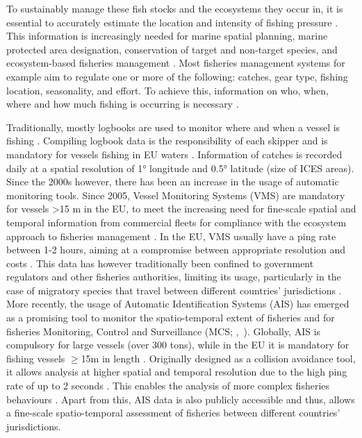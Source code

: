 To sustainably manage these fish stocks and the ecosystems they occur in, it is essential to accurately estimate the location and intensity of fishing pressure \citep{piet_fishing_indicators,russo_indicators,fishing_grounds_greece}. This information
is increasingly needed for marine spatial planning, marine protected area designation, conservation of target and non-target species, and ecosystem-based fisheries management
\citep{vespe_map_2016,henrique_effort_estimation,tidd_importance_effort,gerritsen2010,ais_mpa_designation,ais_bycatch,ais_bird_bycatch}. Most fisheries management systems for example aim to regulate one
or more of the following: catches, gear type, fishing location, seasonality, and effort. To achieve this, information on who, when, where and how much fishing is occurring is necessary \citep{orofino_transparency}.

\medskip

Traditionally, mostly logbooks are used to monitor where and when a vessel is fishing \citep{HINTZEN201231}. Compiling logbook data is the responsibility of each skipper and is mandatory
for vessels fishing in EU waters \citep{euregulation1993}. Information of catches is recorded daily at a spatial resolution of 1° longitude and 0.5° latitude (size of ICES areas). Since the 2000s 
however, there has been an increase in the usage of automatic monitoring tools. Since 2005, Vessel Monitoring Systems (VMS) are mandatory for vessels >15 m in the EU, to meet
the increasing need for fine-scale spatial and temporal information from commercial fleets for compliance with the ecosystem approach to fisheries 
management \citep{ec2003regulation,gerritsen2010}. In the EU, VMS usually have a ping rate between 1-2 hours, aiming at a compromise between
appropriate resolution and costs \citep{shepperson}. This data has however traditionally been confined to government regulators and other fisheries 
authorities, limiting its usage, particularly in the case of migratory species that travel between different countries' jurisdictions
\citep{orofino_transparency,confidentiality}. More recently, the usage of Automatic Identification Systems (AIS) has emerged as a promising tool to monitor
the spatio-temporal extent of fisheries and for fisheries Monitoring, Control and Surveillance (MCS; \mbox{\citeauthor{zhang_ais_mcs}, \citeyear{zhang_ais_mcs}}). Globally, AIS is compulsory for large vessels (over 300 tons), while 
in the EU it is mandatory for fishing vessels $\ge$15m in length \citep{ec2011directive}. Originally designed as a collision avoidance tool, it allows analysis at higher spatial and temporal resolution due 
to the high ping rate of up to 2 seconds \citep{taconet2019global,kontasvesselupdate}. This enables the analysis of more complex fisheries
behaviours \citep{natale}. Apart from this, AIS data is also publicly accessible and thus, allows a fine-scale spatio-temporal assessment of fisheries between different countries' jurisdictions.

